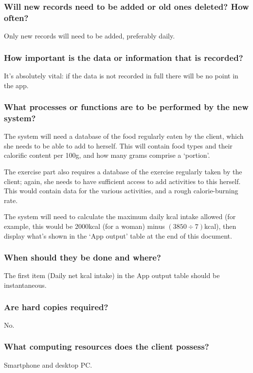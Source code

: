 \subsubsection{Will new records need to be added or old ones deleted? How often?}
Only new records will need to be added, preferably daily.

\subsubsection{How important is the data or information that is recorded?}
It's absolutely vital: if the data is not recorded in full there will be no point in the app.

\subsubsection{What processes or functions are to be performed by the new system?}
The system will need a database of the food regularly eaten by the client, which she needs to be able to add to herself. This will contain food types and their calorific content per 100g, and how many grams comprise a `portion'. 

The exercise part also requires a database of the exercise regularly taken by the client; again, she needs to have sufficient access to add activities to this herself. This would contain data for the various activities, and a rough calorie-burning rate.

The system will need to calculate the maximum daily kcal intake allowed (for example, this would be 2000kcal (for a woman) 
minus $(3850\div 7)$kcal), then display what's shown in the `App output' table at the end of this document.

\subsubsection{When should they be done and where?}
The first item (Daily net kcal intake) in the App output table should be instantaneous.

\subsubsection{Are hard copies required?}
No.

\subsubsection{What computing resources does the client possess?}
Smartphone and desktop PC.

